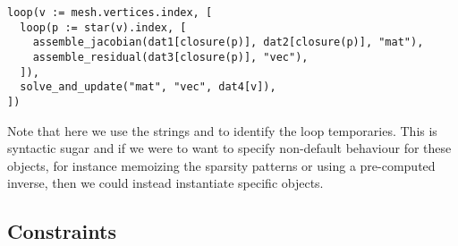 \begin{verbatim}
loop(v := mesh.vertices.index, [
  loop(p := star(v).index, [
    assemble_jacobian(dat1[closure(p)], dat2[closure(p)], "mat"),
    assemble_residual(dat3[closure(p)], "vec"),
  ]),
  solve_and_update("mat", "vec", dat4[v]),
])
\end{verbatim}

Note that here we use the strings  and  to identify the loop temporaries.
This is syntactic sugar and if we were to want to specify non-default behaviour for these objects, for instance memoizing the sparsity patterns or using a pre-computed inverse, then we could instead instantiate specific  objects.

\subsection{Constraints}
\label{sec:future_constraints}

%
%
%
%
%
%

%
%
%
%
%
